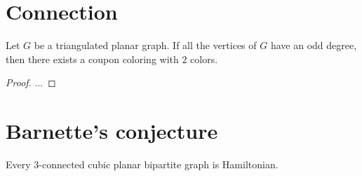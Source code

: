 \section{Connection}

\begin{thm}
  Let $G$ be a triangulated planar graph. If all the vertices of $G$ have an
  odd degree, then there exists a coupon coloring with $2$ colors.
\end{thm}
\begin{proof}
  ...
\end{proof}

\section{Barnette's conjecture}

\begin{conj}
  Every 3-connected cubic planar bipartite graph is Hamiltonian.
\end{conj}

